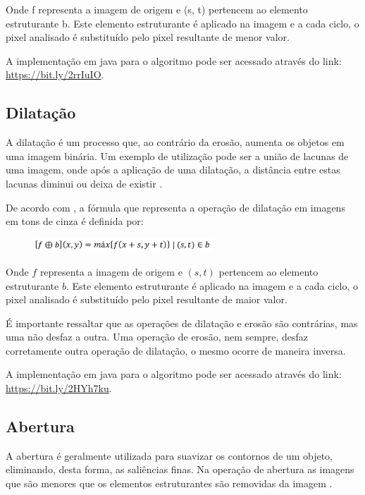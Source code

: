\documentclass[
	12pt,				%
	oneside,			%
	a4paper,			%
	english,			%
	french,				%
	spanish,			%
	brazil,				%
	]{abntex2}
\begin{document}
Onde f representa a imagem de origem e (s, t) pertencem ao elemento estruturante b. Este elemento estruturante é aplicado na imagem e a cada ciclo, o pixel analisado é substituído pelo pixel resultante de menor valor.

A implementação em java para o algoritmo pode ser acessado através do link: \url{https://bit.ly/2rrIuIO}.

\subsection{Dilatação}

A dilatação é um processo que, ao contrário da erosão, aumenta os objetos em uma imagem binária. Um exemplo de utilização pode ser a união de lacunas de uma imagem, onde após a aplicação de uma dilatação, a distância entre estas lacunas diminui ou deixa de existir \cite{gonzalesWoods:2008}. 

De acordo com \citet{pedriniSchwartz:2008}, a fórmula que representa a operação de dilatação em imagens em tons de cinza é definida por:

\begin{figure}[ht]
\centering
\includegraphics[width=0.6\textwidth]{imagens/dilatacao_formula.png}
\end{figure}

Onde \(f\) representa a imagem de origem e \((s, t)\) pertencem ao elemento estruturante \(b\). Este elemento estruturante é aplicado na imagem e a cada ciclo, o pixel analisado é substituído pelo pixel resultante de maior valor.

É importante ressaltar que as operações de dilatação e erosão são contrárias, mas uma não desfaz a outra. Uma operação de erosão, nem sempre, desfaz corretamente outra operação de dilatação, o mesmo ocorre de maneira inversa.

A implementação em java para o algoritmo pode ser acessado através do link: \url{https://bit.ly/2HYh7ku}.

\subsection{Abertura}

A abertura é geralmente utilizada para suavizar os contornos de um objeto, eliminando, desta forma, as saliências finas. Na operação de abertura as imagens que são menores que os elementos estruturantes são removidas da imagem \cite{gonzalesWoods:2008}.
\end{document}
